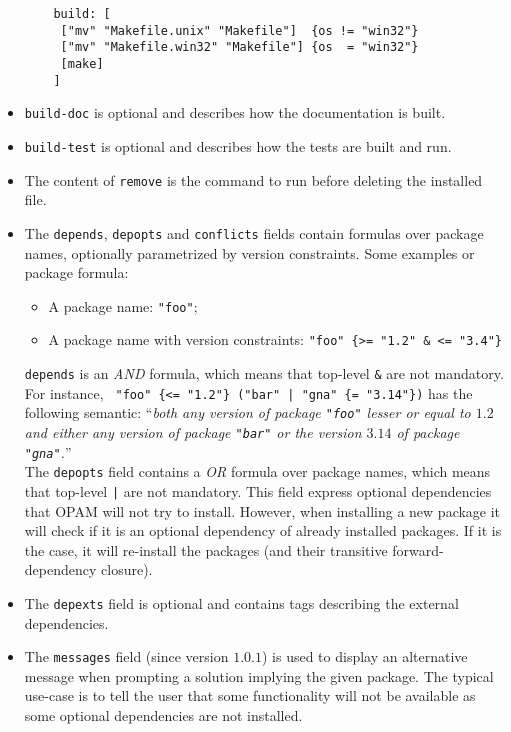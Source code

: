 \documentclass[a4paper,11pt]{article}
\begin{document}
\begin{itemize}
  \begin{Verbatim}
    build: [
     ["mv" "Makefile.unix" "Makefile"]  {os != "win32"}
     ["mv" "Makefile.win32" "Makefile"] {os  = "win32"}
     [make]
    ]
  \end{Verbatim}

\item {\tt build-doc} is optional and describes how the documentation
  is built.

\item {\tt build-test} is optional and describes how the tests are
  built and run.

\item The content of {\tt remove} is the command to run before deleting
  the installed file.

\item The {\tt depends}, {\tt depopts} and {\tt conflicts} fields
  contain formulas over package names, optionally parametrized by
  version constraints. Some examples or package formula:

\begin{itemize}
\item A package name: {\tt "foo"};
\item A package name with version constraints:
  \verb+"foo" {>= "1.2" & <= "3.4"}+
\end{itemize}

{\tt depends} is an {\em AND} formula, which means that top-level
\verb+&+ are not mandatory. For instance,
 \verb+ "foo" {<= "1.2"} ("bar" | "gna" {= "3.14"})+ has the following
 semantic:  ``{\em both any version of package
  {\tt "foo"} lesser or equal to $1.2$ and either any version of package
  {\tt "bar"} or the version $3.14$ of package {\tt "gna"}.}''  \\

The {\tt depopts} field contains a {\em OR} formula over
  package names, which means that top-level \verb+|+ are not
  mandatory. This field express optional dependencies that
  OPAM will not try to install. However, when installing a new
  package it will check if it is an optional dependency of already
  installed packages. If it is the case, it will re-install the
  packages (and their transitive forward-dependency closure).

\item The {\tt depexts} field is optional and contains tags describing
  the external dependencies.

\item The {\tt messages} field (since version $1.0.1$) is used to
  display an alternative message when prompting a solution implying
  the given package. The typical use-case is to tell the user that
  some functionality will not be available as some optional
  dependencies are not installed.


\end{itemize}
\end{document}
